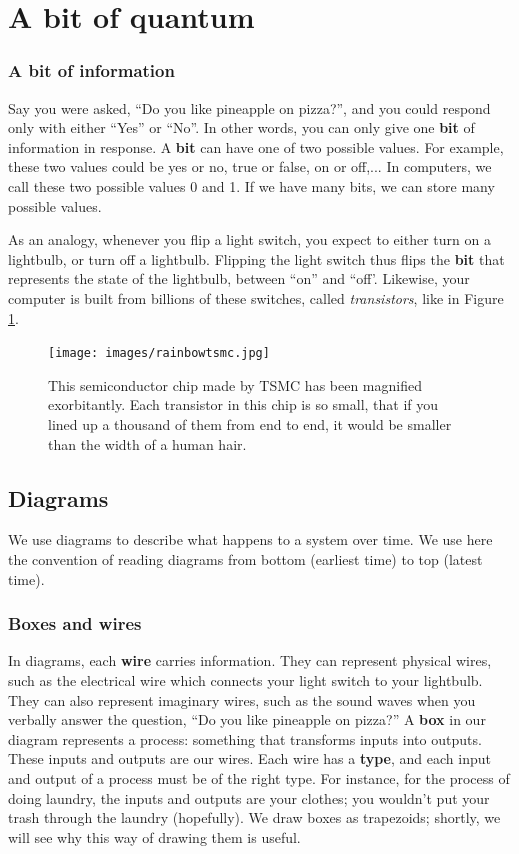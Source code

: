 \documentclass{article}
\theoremstyle{definition}
\begin{document}
\tableofcontents

\section{A bit of quantum}
\subsubsection{A \textbf{bit} of information}
Say you were asked, ``Do you like pineapple on pizza?'', and you could respond only with either ``Yes'' or ``No''.
In other words, you can only give one \textbf{bit} of information in response.
A \textbf{bit} can have one of two possible values.  For example, these two values could be yes or no, true or false, on or off,...
In computers, we call these two possible values 0 and 1.  If we have many bits, we can store many possible values.

As an analogy, whenever you flip a light switch, you expect to either turn on a lightbulb, or turn off a lightbulb.
Flipping the light switch thus flips the \textbf{bit} that represents the state of the lightbulb, between ``on'' and ``off'.
Likewise, your computer is built from billions of these switches, called \textit{transistors}, like in Figure \ref{fig:tsmc}.
\begin{figure}[H]%
	\label{fig:tsmc}
	\texttt{[image: images/rainbowtsmc.jpg]}
	\caption{This semiconductor chip made by TSMC has been magnified exorbitantly.  Each transistor in this chip is so small, that if you lined up a thousand of them from end to end, it would be smaller than the width of a human hair.}
\end{figure}

\subsection{Diagrams}
We use diagrams to describe what happens to a system over time.  We use here the convention of reading diagrams from bottom (earliest time) to top (latest time).
\subsubsection{\textbf{Boxes} and \textbf{wires}}
In diagrams, each \textbf{wire} carries information.  They can represent physical wires, such as the electrical wire which connects your light switch to your lightbulb.  They can also represent imaginary wires, such as the sound waves when you verbally answer the question, ``Do you like pineapple on pizza?''
A \textbf{box} in our diagram represents a process: something that transforms inputs into outputs.
These inputs and outputs are our wires.  Each wire has a \textbf{type}, and each input and output of a process must be of the right type.  For instance, for the process of doing laundry, the inputs and outputs are your clothes; you wouldn't put your trash through the laundry (hopefully).
We draw boxes as trapezoids; shortly, we will see why this way of drawing them is useful.
\end{document}
